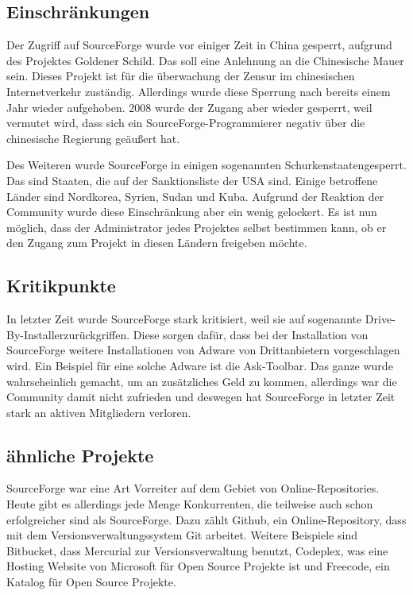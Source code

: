 \subsection{Einschränkungen}
Der Zugriff auf SourceForge wurde vor einiger Zeit in China gesperrt, aufgrund des Projektes \glqq Goldener Schild\grqq \space. Das soll eine Anlehnung an die Chinesische Mauer sein. Dieses Projekt ist für die überwachung der Zensur im chinesischen Internetverkehr zuständig. Allerdings wurde diese Sperrung nach bereits einem Jahr wieder aufgehoben. 2008 wurde der Zugang aber wieder gesperrt, weil vermutet wird, dass sich ein SourceForge-Programmierer negativ über die chinesische Regierung geäu{\ss}ert hat. 

Des Weiteren wurde SourceForge in einigen sogenannten \glqq Schurkenstaaten\grqq \space gesperrt. Das sind Staaten, die auf der Sanktionsliste der USA sind. Einige betroffene Länder sind Nordkorea, Syrien, Sudan und Kuba. Aufgrund der Reaktion der Community wurde diese Einschränkung aber ein wenig gelockert. Es ist nun möglich, dass der Administrator jedes Projektes selbst bestimmen kann, ob er den Zugang zum Projekt in diesen Ländern freigeben möchte. 

\subsection{Kritikpunkte}
In letzter Zeit wurde SourceForge stark kritisiert, weil sie auf sogenannte \glqq Drive-By-Installer\grqq \space zurückgriffen. Diese sorgen dafür, dass bei der Installation von SourceForge weitere Installationen von Adware von Drittanbietern vorgeschlagen wird. Ein Beispiel für eine solche Adware ist die \glqq Ask-Toolbar\grqq. Das ganze wurde wahrscheinlich gemacht, um an zusätzliches Geld zu kommen, allerdings war die Community damit nicht zufrieden und deswegen hat SourceForge in letzter Zeit stark an aktiven Mitgliedern verloren. 

\subsection{ähnliche Projekte}

SourceForge war eine Art Vorreiter auf dem Gebiet von Online-Repositories. Heute gibt es allerdings jede Menge Konkurrenten, die teilweise auch schon erfolgreicher sind als SourceForge. Dazu zählt Github, ein Online-Repository, dass mit dem Versionsverwaltungssystem Git arbeitet. Weitere Beispiele sind Bitbucket, dass Mercurial zur Versionsverwaltung benutzt, Codeplex, was eine Hosting Website von Microsoft für Open Source Projekte ist und Freecode, ein Katalog für Open Source Projekte.


